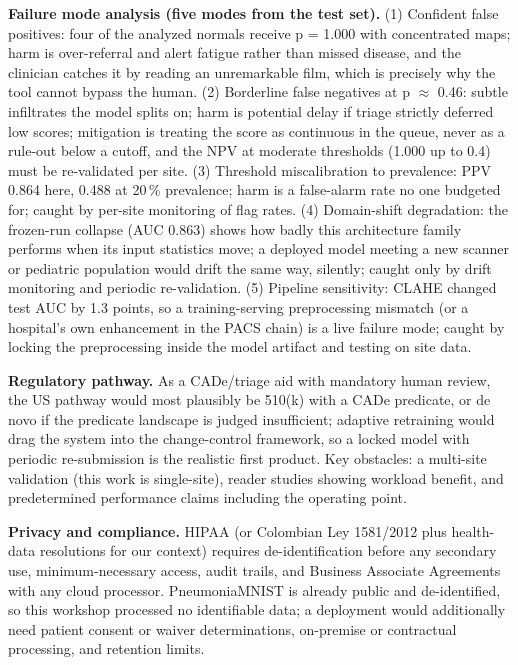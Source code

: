 \documentclass[11pt,a4paper]{article}
\begin{document}
\textbf{Failure mode analysis (five modes from the test set).} (1) Confident false positives: four of the analyzed normals receive p = 1.000 with concentrated maps; harm is over-referral and alert fatigue rather than missed disease, and the clinician catches it by reading an unremarkable film, which is precisely why the tool cannot bypass the human. (2) Borderline false negatives at p $\approx$ 0.46: subtle infiltrates the model splits on; harm is potential delay if triage strictly deferred low scores; mitigation is treating the score as continuous in the queue, never as a rule-out below a cutoff, and the NPV at moderate thresholds (1.000 up to 0.4) must be re-validated per site. (3) Threshold miscalibration to prevalence: PPV 0.864 here, 0.488 at 20\,\% prevalence; harm is a false-alarm rate no one budgeted for; caught by per-site monitoring of flag rates. (4) Domain-shift degradation: the frozen-run collapse (AUC 0.863) shows how badly this architecture family performs when its input statistics move; a deployed model meeting a new scanner or pediatric population would drift the same way, silently; caught only by drift monitoring and periodic re-validation. (5) Pipeline sensitivity: CLAHE changed test AUC by 1.3 points, so a training-serving preprocessing mismatch (or a hospital's own enhancement in the PACS chain) is a live failure mode; caught by locking the preprocessing inside the model artifact and testing on site data.

\textbf{Regulatory pathway.} As a CADe/triage aid with mandatory human review, the US pathway would most plausibly be 510(k) with a CADe predicate, or de novo if the predicate landscape is judged insufficient; adaptive retraining would drag the system into the change-control framework, so a locked model with periodic re-submission is the realistic first product. Key obstacles: a multi-site validation (this work is single-site), reader studies showing workload benefit, and predetermined performance claims including the operating point.

\textbf{Privacy and compliance.} HIPAA (or Colombian Ley 1581/2012 plus health-data resolutions for our context) requires de-identification before any secondary use, minimum-necessary access, audit trails, and Business Associate Agreements with any cloud processor. PneumoniaMNIST is already public and de-identified, so this workshop processed no identifiable data; a deployment would additionally need patient consent or waiver determinations, on-premise or contractual processing, and retention limits.
\end{document}
